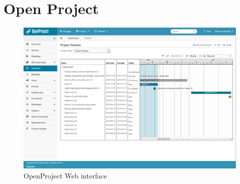 \chapter{Open Project}
\label{chp:openproject}

\begin{figure}[!th]
\centering
\includegraphics[scale=0.45]{./supportfiles/openproject.png}
\caption{OpenProject Web interface}
\label{fig:openProject}
\end{figure}